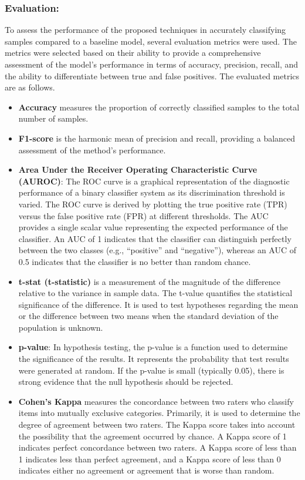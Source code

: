 \documentclass[review,1p,times,numbers]{elsarticle}
\begin{document}
\subsubsection{Evaluation:}
To assess the performance of the proposed techniques in accurately classifying samples compared to a baseline model, several evaluation metrics were used. The metrics were selected based on their ability to provide a comprehensive assessment of the model's performance in terms of accuracy, precision, recall, and the ability to differentiate between true and false positives. The evaluated metrics are as follows.
\begin{itemize}
    \item \textbf{Accuracy} measures the proportion of correctly classified samples to the total number of samples.
    \item \textbf{F1-score} is the harmonic mean of precision and recall, providing a balanced assessment of the method's performance.
    \item \textbf{Area Under the Receiver Operating Characteristic Curve (AUROC)}: The ROC curve is a graphical representation of the diagnostic performance of a binary classifier system as its discrimination threshold is varied. The ROC curve is derived by plotting the true positive rate (TPR) versus the false positive rate (FPR) at different thresholds. The AUC provides a single scalar value representing the expected performance of the classifier. An AUC of 1 indicates that the classifier can distinguish perfectly between the two classes (e.g., ``positive'' and ``negative''), whereas an AUC of 0.5 indicates that the classifier is no better than random chance.
    \item \textbf{t-stat (t-statistic)} is a measurement of the magnitude of the difference relative to the variance in sample data. The t-value quantifies the statistical significance of the difference. It is used to test hypotheses regarding the mean or the difference between two means when the standard deviation of the population is unknown.
    \item \textbf{p-value}: In hypothesis testing, the p-value is a function used to determine the significance of the results. It represents the probability that test results were generated at random. If the p-value is small (typically 0.05), there is strong evidence that the null hypothesis should be rejected.
    \item \textbf{Cohen's Kappa} measures the concordance between two raters who classify items into mutually exclusive categories. Primarily, it is used to determine the degree of agreement between two raters. The Kappa score takes into account the possibility that the agreement occurred by chance. A Kappa score of 1 indicates perfect concordance between two raters. A Kappa score of less than 1 indicates less than perfect agreement, and a Kappa score of less than 0 indicates either no agreement or agreement that is worse than random.

\end{itemize}
\end{document}
